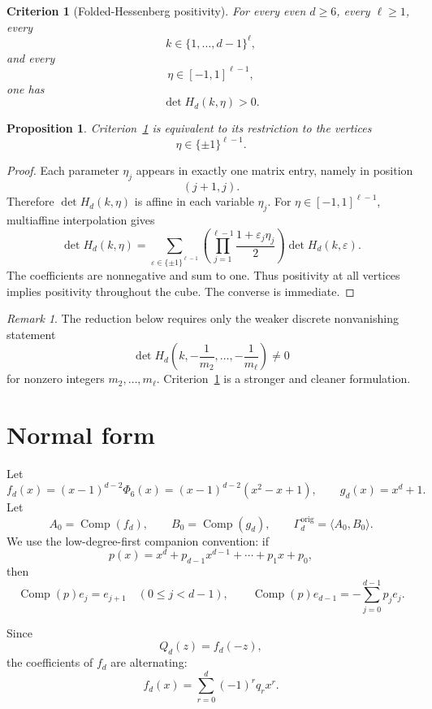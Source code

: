 \documentclass[a4paper,11pt]{amsart}
\newcommand{\Comp}{\operatorname{Comp}}
\newtheorem{proposition}[theorem]{Proposition}
\newtheorem{criterion}[theorem]{Criterion}
\theoremstyle{remark}
\newtheorem{remark}[theorem]{Remark}
\numberwithin{equation}{section}
\begin{document}
\begin{criterion}[Folded-Hessenberg positivity]\label{crit:folded-hessenberg}
For every even \(d\geq6\), every \(\ell\geq1\), every
\[
k\in\{1,\ldots,d-1\}^{\ell},
\]
and every
\[
\eta\in[-1,1]^{\ell-1},
\]
one has
\begin{equation}\label{eq:criterion}
\det H_d(k,\eta)>0.
\end{equation}
\end{criterion}

\begin{proposition}\label{prop:sign-version}
Criterion~\ref{crit:folded-hessenberg} is equivalent to its restriction to the vertices
\[
\eta\in\{\pm1\}^{\ell-1}.
\]
\end{proposition}

\begin{proof}
Each parameter \(\eta_j\) appears in exactly one matrix entry, namely in position
\[
(j+1,j).
\]
Therefore \(\det H_d(k,\eta)\) is affine in each variable \(\eta_j\). For \(\eta\in[-1,1]^{\ell-1}\), multiaffine interpolation gives
\[
\det H_d(k,\eta)
=
\sum_{\varepsilon\in\{\pm1\}^{\ell-1}}
\left(
\prod_{j=1}^{\ell-1}
\frac{1+\varepsilon_j\eta_j}{2}
\right)
\det H_d(k,\varepsilon).
\]
The coefficients are nonnegative and sum to one. Thus positivity at all vertices implies positivity throughout the cube. The converse is immediate.
\end{proof}

\begin{remark}
The reduction below requires only the weaker discrete nonvanishing statement
\[
\det H_d\left(k,-\frac1{m_2},\ldots,-\frac1{m_\ell}\right)\neq0
\]
for nonzero integers \(m_2,\ldots,m_\ell\). Criterion~\ref{crit:folded-hessenberg} is a stronger and cleaner formulation.
\end{remark}

\section{Normal form}

Let
\[
f_d(x)=(x-1)^{d-2}\Phi_6(x)=(x-1)^{d-2}(x^2-x+1),
\qquad
g_d(x)=x^d+1.
\]
Let
\[
A_0=\Comp(f_d),
\qquad
B_0=\Comp(g_d),
\qquad
\Gamma_d^{\mathrm{orig}}=\langle A_0,B_0\rangle.
\]
We use the low-degree-first companion convention: if
\[
p(x)=x^d+p_{d-1}x^{d-1}+\cdots+p_1x+p_0,
\]
then
\[
\Comp(p)e_j=e_{j+1}
\quad(0\leq j<d-1),
\qquad
\Comp(p)e_{d-1}
=
-\sum_{j=0}^{d-1}p_je_j.
\]

Since
\[
Q_d(z)=f_d(-z),
\]
the coefficients of \(f_d\) are alternating:
\[
f_d(x)=\sum_{r=0}^{d}(-1)^rq_rx^r.
\]
\end{document}

